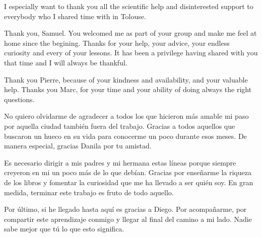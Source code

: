 \starbreak


I especially want to thank you all the scientific help and disinterested support to everybody who I shared time with in Tolouse.

Thank you, Samuel. You welcomed me as part of your group and make me feel at home since the begining. Thanks for your help, your advice, your endless curiosity and every of your lessons. It has been a privilege having shared with you that time and I will always be thankful.

Thank you Pierre, because of your kindness and availability, and your valuable help. Thanks you Marc, for your time and your ability of doing always the right questions. %

No quiero olvidarme de agradecer a todos los que hicieron más amable mi paso por aquella ciudad también fuera del trabajo. Gracias a todos aquellos que buscaron un hueco en su vida para conocerme un poco durante esos meses. De manera especial, gracias Danila por tu amistad.  

\starbreak

Es necesario dirigir a mis padres y mi hermana estas líneas porque siempre creyeron en mi un poco más de lo que debían. Gracias por enseñarme la riqueza de los libros y fomentar la curiosidad que me ha llevado a ser quién soy. En gran medida, terminar este trabajo es fruto de todo aquello.

Por último, si he llegado hasta aquí es gracias a Diego. Por acompañarme, por compartir este aprendizaje conmigo y llegar al final del camino a mi lado. Nadie sabe mejor que tú lo que esto significa. 

\starbreak




